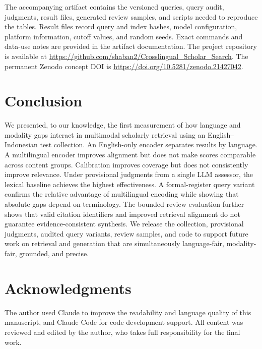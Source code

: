 \documentclass[conference]{IEEEtran}
\begin{document}
The accompanying artifact contains the versioned queries, query audit,
judgments, result files, generated review samples, and scripts needed to
reproduce the tables. Result files record query and index hashes, model
configuration, platform information, cutoff values, and random seeds. Exact
commands and data-use notes are provided in the artifact documentation. The
project repository is available at
\url{https://github.com/shaban2/Crosslingual_Scholar_Search}. The permanent
Zenodo concept DOI is \url{https://doi.org/10.5281/zenodo.21427042}.

\section{Conclusion}

We presented, to our knowledge, the first measurement of how language and
modality gaps interact in multimodal scholarly retrieval using an
English--Indonesian test collection. An English-only encoder separates
results by language. A multilingual encoder improves alignment but does not
make scores comparable across content groups. Calibration improves coverage
but does not consistently improve relevance. Under provisional judgments
from a single LLM assessor, the lexical baseline achieves the highest
effectiveness. A formal-register query variant confirms the relative
advantage of multilingual encoding while showing that absolute gaps depend
on terminology. The bounded review evaluation further shows that valid
citation identifiers and improved retrieval alignment do not guarantee
evidence-consistent synthesis. We release the collection, provisional
judgments, audited query variants, review samples, and code to support future
work on retrieval and generation that are simultaneously language-fair,
modality-fair, grounded, and precise.

\section*{Acknowledgments}

The author used Claude to improve the readability and language quality of
this manuscript, and Claude Code for code development support. All content
was reviewed and edited by the author, who takes full responsibility for the
final work.
\end{document}
